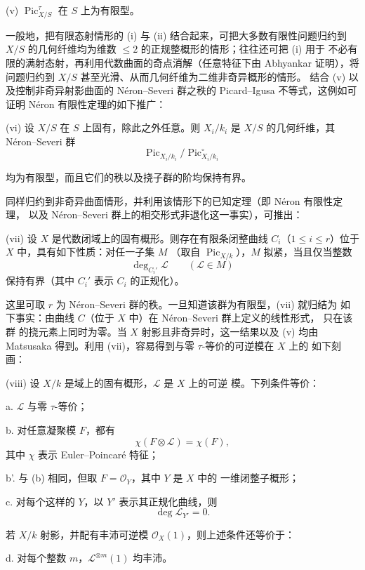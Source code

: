 \medskip
\noindent(v) $\operatorname{Pic}_{X/S}^\tau$ 在 $S$ 上为有限型。

一般地，把有限态射情形的 (i) 与 (ii) 结合起来，可把大多数有限性问题归约到
$X/S$ 的几何纤维均为维数 $\leq2$ 的正规整概形的情形；往往还可把 (i) 用于
不必有限的满射态射，再利用代数曲面的奇点消解（任意特征下由 Abhyankar
证明），将问题归约到 $X/S$ 甚至光滑、从而几何纤维为二维非奇异概形的情形。
结合 (v) 以及控制非奇异射影曲面的 Néron--Severi 群之秩的 Picard--Igusa
不等式，这例如可证明 Néron 有限性定理的如下推广：

\medskip
\noindent(vi) 设 $X/S$ 在 $S$ 上固有，除此之外任意。则 $X_i/k_i$ 是
$X/S$ 的几何纤维，其 Néron--Severi 群
\[
\operatorname{Pic}_{X_i/k_i}/\operatorname{Pic}_{X_i/k_i}^\circ
\]

均为有限型，而且它们的秩以及挠子群的阶均保持有界。

同样归约到非奇异曲面情形，并利用该情形下的已知定理（即 Néron 有限性定理，
以及 Néron--Severi 群上的相交形式非退化这一事实），可推出：

\medskip
\noindent(vii) 设 $X$ 是代数闭域上的固有概形。则存在有限条闭整曲线
$C_i$（$1\leq i\leq r$）位于 $X$ 中，具有如下性质：对任一子集 $M$
（取自 $\operatorname{Pic}_{X/k}$），$M$ 拟紧，当且仅当整数
\[
\deg_{C_i'}\mathcal L\qquad(\mathcal L\in M)
\]
保持有界（其中 $C_i'$ 表示 $C_i$ 的正规化）。

这里可取 $r$ 为 Néron--Severi 群的秩。一旦知道该群为有限型，(vii) 就归结为
如下事实：由曲线 $C$（位于 $X$ 中）在 Néron--Severi 群上定义的线性形式，
只在该群
的挠元素上同时为零。当 $X$ 射影且非奇异时，这一结果以及 (v) 均由
Matsusaka 得到。利用 (vii)，容易得到与零 $\tau$-等价的可逆模在 $X$ 上的
如下刻画：

\medskip
\noindent(viii) 设 $X/k$ 是域上的固有概形，$\mathcal L$ 是 $X$ 上的可逆
模。下列条件等价：

\noindent a. $\mathcal L$ 与零 $\tau$-等价；

\noindent b. 对任意凝聚模 $F$，都有
\[
\chi(F\otimes\mathcal L)=\chi(F),
\]
其中 $\chi$ 表示 Euler--Poincaré 特征；

\noindent b'. 与 (b) 相同，但取 $F=\mathcal O_Y$，其中 $Y$ 是 $X$ 中的
一维闭整子概形；

\noindent c. 对每个这样的 $Y$，以 $Y'$ 表示其正规化曲线，则
\[
\deg\mathcal L_{Y'}=0.
\]

若 $X/k$ 射影，并配有丰沛可逆模 $\mathcal O_X(1)$，则上述条件还等价于：

\noindent d. 对每个整数 $m$，$\mathcal L^{\otimes m}(1)$ 均丰沛。

